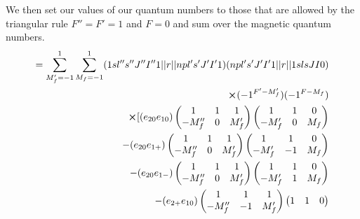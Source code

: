 We then set our values of our quantum numbers to those that are allowed by the triangular rule \(F''=F'=1\) and \(F=0\) and sum over the magnetic quantum numbers.
\begin{align}
    \begin{split}
            =\sum_{M_f'=-1}^1\sum_{M_f=-1}^1
            (1sl'' s'' J'' I'' 1\abs{\abs{r}}npl's'J'I'1)
            (npl' s' J' I' 1\abs{\abs{r}}1s lsJI0)\\
            \cross (-1^{F'-M_f'})(-1^{F-M_f})\\
            \cross
            [
            (e_{20}e_{10})
            \begin{pmatrix}
             1    & 1 & 1\\
            -M_f'' & 0 &M_f'
            \end{pmatrix}
            \begin{pmatrix}
            1    & 1 & 0\\
            -M_f' & 0 &M_f
            \end{pmatrix}\\
            -
            (e_{20}e_{1+})
            \begin{pmatrix}
             1    & 1 & 1\\
            -M_f'' & 0 &M_f'
            \end{pmatrix}
            \begin{pmatrix}
            1    & 1 & 0\\
            -M_f' & -1 &M_f
            \end{pmatrix}\\
            -
            (e_{20}e_{1-})
            \begin{pmatrix}
             1    & 1 & 1\\
            -M_f'' & 0 &M_f'
            \end{pmatrix}
            \begin{pmatrix}
            1    & 1 & 0\\
            -M_f' & 1 &M_f
            \end{pmatrix}\\
            -
            (e_{2+}e_{10})
            \begin{pmatrix}
             1    & 1 & 1\\
            -M_f'' & -1 &M_f'
            \end{pmatrix}
            \begin{pmatrix}
            1    & 1 & 0\\

\end{pmatrix}
\end{split}
\end{align}
